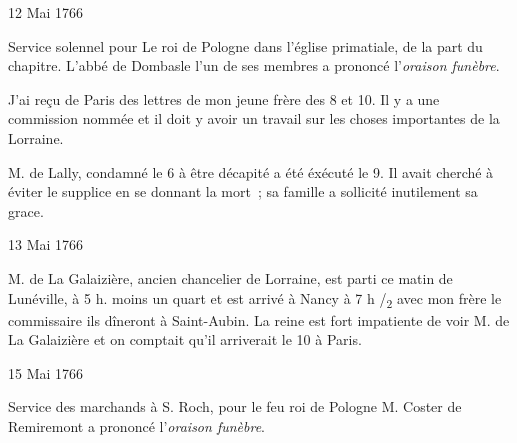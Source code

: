                      \begin{diary}{12 Mai 1766}{}
                        
                         Service solennel pour Le roi de Pologne
                           dans l’église
                              primatiale, de la part du chapitre.
                           L'abbé de Dombasle l'un de
                           ses membres
                           a prononcé l'\emph{oraison
                              funèbre}. \bigskip
        
        
                         J'ai reçu de Paris des lettres de mon jeune
                              frère des 8 et
                              10. Il y a une commission
                           nommée et il doit y avoir un travail
                           sur les choses importantes de la Lorraine. \bigskip
        
        
                        
                           M. de Lally, condamné le 6 à être
                           décapité a été éxécuté le 9. Il
                           avait
                           cherché à éviter le supplice en se donnant la
                           mort ; sa famille a sollicité inutilement
                           sa grace. \bigskip
        
        
                     \end{diary}
                     \begin{diary}{13 Mai 1766}{}
                        
                        
                           M. de La Galaizière, ancien
                           chancelier de
                           Lorraine, est parti ce matin
                           de Lunéville, à 5 h. moins un quart et est arrivé à
                           Nancy à 7 h /\textsubscript{2} avec mon frère le commissaire
                           ils dîneront à Saint-Aubin. La
                              reine est fort
                           impatiente de voir M. de La Galaizière et on comptait
                           qu'il arriverait le 10 à
                              Paris. \bigskip
        
        
                     \end{diary}

                     \begin{diary}{15 Mai 1766}{}
                        
                         Service des marchands à S. Roch, pour le feu
                              roi de Pologne
                           M. Coster de Remiremont a prononcé
                           l'\emph{oraison funèbre}. \bigskip
        
        
                     \end{diary}

